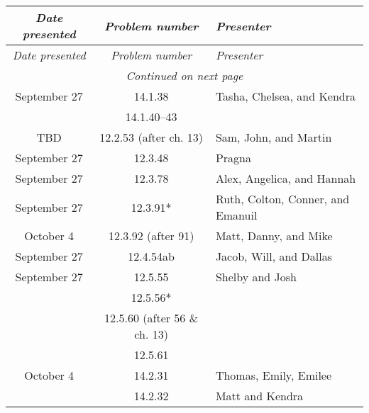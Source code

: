\documentclass[12pt]{amsart}
\begin{document}
    \begin{longtable}{c|c|l}
        \emph{Date presented} &\emph{Problem number} & \emph{Presenter} \\ \hline
        \endfirsthead
        \emph{Date presented} & \emph{Problem number} & \emph{Presenter} \\ \hline
        \endhead
        \hline
        \multicolumn{3}{c}{\emph{Continued on next page}} \\
        \endfoot
        \hline 
        \endlastfoot
        September 27    & 14.1.38                              & Tasha, Chelsea, and Kendra               \\
                        & 14.1.40--43                          &                                          \\
        TBD             & 12.2.53 (after ch. 13)               & Sam, John, and Martin                    \\
        September 27    & 12.3.48                              & Pragna                                   \\
        September 27    & 12.3.78                              & Alex, Angelica, and Hannah               \\
        September 27    & 12.3.91*                             & Ruth, Colton, Conner, and Emanuil        \\
        October 4       & 12.3.92 (after 91)                   & Matt, Danny, and Mike                    \\
        September 27    & 12.4.54ab                            & Jacob, Will, and Dallas                  \\
        September 27    & 12.5.55                              & Shelby and Josh                          \\
                        & 12.5.56*                             &                                          \\
                        & 12.5.60 (after 56 \& ch. 13)         &                                          \\
                        & 12.5.61                              &                                          \\
        October 4       & 14.2.31                              & Thomas, Emily, Emilee                    \\
                        & 14.2.32                              & Matt and Kendra                          \\

\end{longtable}
\end{document}
